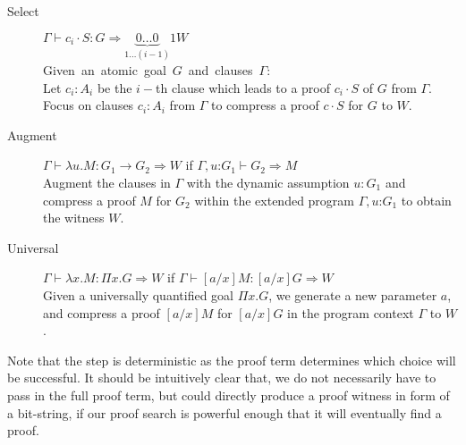 \documentclass{llncs}
\newcommand{\fighead}{\hrule\vspace{1.5ex}}
\newcommand{\vd}{\vdash}
\newcommand{\arrow}{\rightarrow}
\newcommand{\oftp}{\mathord{:}}
\begin{document}
\begin{small}
\begin{description}
\item[Select] $\Gamma \vd c_i \cdot S: G \Rightarrow
  \underset{1 \ldots (i-1)}{\underbrace{0\ldots 0}}1
W $ \\
    \mbox{Given an atomic goal $G$ and clauses $\Gamma$:}\hfill\\
     Let $c_i : A_i$ be the $i-$th clause which leads to a
    proof $c_i\cdot S$ of $G$ from $\Gamma$. \\
    Focus on clauses $c_i : A_i$ from $\Gamma$ to compress a proof
     $c\cdot S$ for $G$ to $W$.

\item[Augment] $\Gamma \vd   \lambda u. M : G_1 \arrow G_2 \Rightarrow
  W$ if $\Gamma,
  u\oftp G_1 \vd G_2 \Rightarrow M$ \\
Augment the clauses in $\Gamma$ with the dynamic assumption $u{:} G_1$ and
compress a proof $M$ for $G_2$ within the extended program
$\Gamma, u \oftp G_1$ to obtain the witness $W$. 
\item[Universal] $\Gamma \vd  \lambda x. M : \Pi x. G \Rightarrow W$ if $\Gamma \vd
  [a/x]M: [a/x]G\Rightarrow W$  \\ %
Given a universally quantified goal $\Pi x. G$, we generate a new
parameter $a$, and compress a proof $[a/x]M$  for $[a/x]G$ in the
program context $\Gamma$ to $W$.\\
\end{description}
\end{small}    
%

Note that the {} step is deterministic as the proof term
determines which choice will be successful. It should be intuitively
clear that, we do not necessarily have to pass in the full proof term,
but could directly produce a proof witness in form of a bit-string, if
our proof search is powerful enough that it will eventually find a proof.
\end{document}
